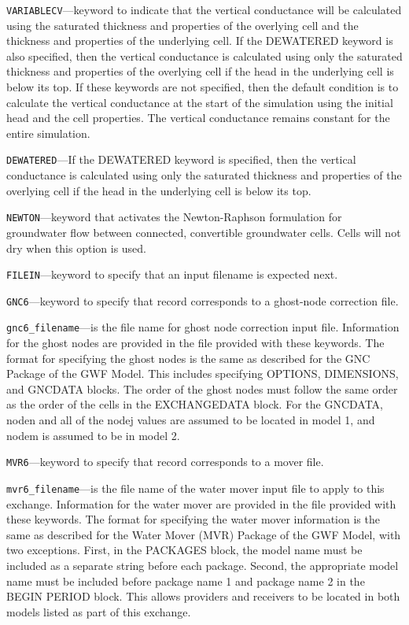 \begin{description}
\item \texttt{VARIABLECV}---keyword to indicate that the vertical conductance will be calculated using the saturated thickness and properties of the overlying cell and the thickness and properties of the underlying cell.  If the DEWATERED keyword is also specified, then the vertical conductance is calculated using only the saturated thickness and properties of the overlying cell if the head in the underlying cell is below its top.  If these keywords are not specified, then the default condition is to calculate the vertical conductance at the start of the simulation using the initial head and the cell properties.  The vertical conductance remains constant for the entire simulation.

\item \texttt{DEWATERED}---If the DEWATERED keyword is specified, then the vertical conductance is calculated using only the saturated thickness and properties of the overlying cell if the head in the underlying cell is below its top.

\item \texttt{NEWTON}---keyword that activates the Newton-Raphson formulation for groundwater flow between connected, convertible groundwater cells. Cells will not dry when this option is used.

\item \texttt{FILEIN}---keyword to specify that an input filename is expected next.

\item \texttt{GNC6}---keyword to specify that record corresponds to a ghost-node correction file.

\item \texttt{gnc6\_filename}---is the file name for ghost node correction input file.  Information for the ghost nodes are provided in the file provided with these keywords.  The format for specifying the ghost nodes is the same as described for the GNC Package of the GWF Model.  This includes specifying OPTIONS, DIMENSIONS, and GNCDATA blocks.  The order of the ghost nodes must follow the same order as the order of the cells in the EXCHANGEDATA block.  For the GNCDATA, noden and all of the nodej values are assumed to be located in model 1, and nodem is assumed to be in model 2.

\item \texttt{MVR6}---keyword to specify that record corresponds to a mover file.

\item \texttt{mvr6\_filename}---is the file name of the water mover input file to apply to this exchange.  Information for the water mover are provided in the file provided with these keywords.  The format for specifying the water mover information is the same as described for the Water Mover (MVR) Package of the GWF Model, with two exceptions.  First, in the PACKAGES block, the model name must be included as a separate string before each package.  Second, the appropriate model name must be included before package name 1 and package name 2 in the BEGIN PERIOD block.  This allows providers and receivers to be located in both models listed as part of this exchange.


\end{description}
